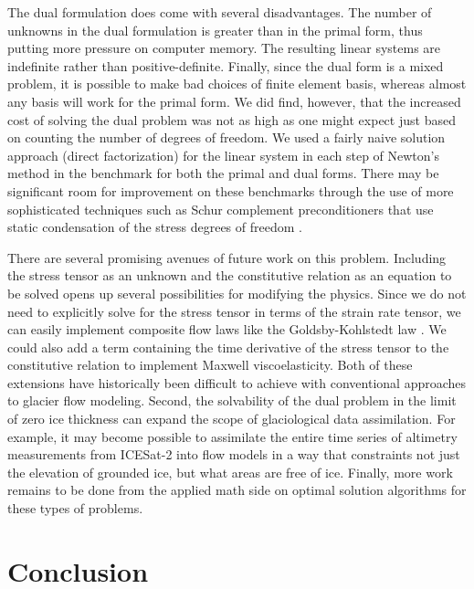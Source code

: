 \documentclass[review,oneside]{igs}
\begin{document}
The dual formulation does come with several disadvantages.
The number of unknowns in the dual formulation is greater than in the primal form, thus putting more pressure on computer memory.
The resulting linear systems are indefinite rather than positive-definite.
Finally, since the dual form is a mixed problem, it is possible to make bad choices of finite element basis, whereas almost any basis will work for the primal form.
We did find, however, that the increased cost of solving the dual problem was not as high as one might expect just based on counting the number of degrees of freedom.
We used a fairly naive solution approach (direct factorization) for the linear system in each step of Newton's method in the benchmark for both the primal and dual forms.
There may be significant room for improvement on these benchmarks through the use of more sophisticated techniques such as Schur complement preconditioners that use static condensation of the stress degrees of freedom \citep{boffi2013mixed}.

There are several promising avenues of future work on this problem.
Including the stress tensor as an unknown and the constitutive relation as an equation to be solved opens up several possibilities for modifying the physics.
Since we do not need to explicitly solve for the stress tensor in terms of the strain rate tensor, we can easily implement composite flow laws like the Goldsby-Kohlstedt law \citep{goldsby2001superplastic}.
We could also add a term containing the time derivative of the stress tensor to the constitutive relation to implement Maxwell viscoelasticity.
Both of these extensions have historically been difficult to achieve with conventional approaches to glacier flow modeling.
Second, the solvability of the dual problem in the limit of zero ice thickness can expand the scope of glaciological data assimilation.
For example, it may become possible to assimilate the entire time series of altimetry measurements from ICESat-2 into flow models in a way that constraints not just the elevation of grounded ice, but what areas are free of ice.
Finally, more work remains to be done from the applied math side on optimal solution algorithms for these types of problems.


\section{Conclusion}
\end{document}
